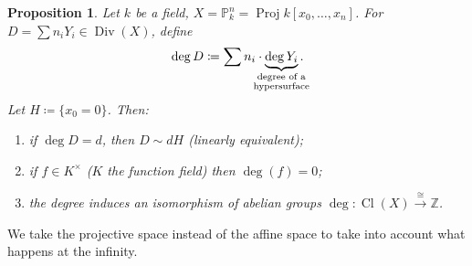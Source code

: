 \documentclass[12pt]{article}
\DeclareMathOperator{\Proj}{Proj}
\DeclareMathOperator{\Div}{Div}
\DeclareMathOperator{\Cl}{Cl}
\newtheorem*{proposition}{Proposition}
\theoremstyle{definition}
\begin{document}
\begin{proposition}
Let $k$ be a field, $X=\mathbb P_k^n=\Proj k[x_0,\ldots,x_n]$. For $D=\sum n_iY_i\in\Div(X)$, define
\[\deg D\coloneqq\sum n_i\cdot\underbrace{\deg Y_i}_{\mathclap{\substack{\text{degree of a}\\\text{hypersurface}}}}.\]
Let $H\coloneqq\{x_0=0\}$. Then:
\begin{enumerate}[label=\arabic*)]
\item\label{linearly_equivalent} if $\deg D=d$, then $D\sim dH$ (linearly equivalent);
\item if $f\in K^\times$ ($K$ the function field) then $\deg(f)=0$;
\item the degree induces an isomorphism of abelian groups $\deg:\Cl(X)\xrightarrow\cong\mathbb Z$.
\end{enumerate}
\end{proposition}

We take the projective space instead of the affine space to take into account what happens at the infinity.
\end{document}
